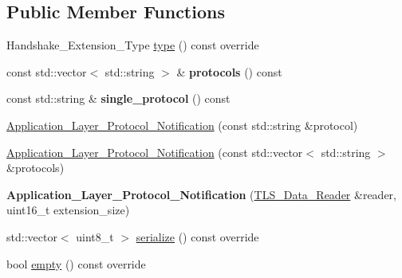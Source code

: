 \subsection*{Public Member Functions}
\begin{DoxyCompactItemize}
\item 
Handshake\+\_\+\+Extension\+\_\+\+Type \mbox{\hyperlink{class_botan_1_1_t_l_s_1_1_application___layer___protocol___notification_ab60d32531c669dd0d23fdddec69eee17}{type}} () const override
\item 
\mbox{\label{class_botan_1_1_t_l_s_1_1_application___layer___protocol___notification_ae88699feca78c6622f85a890b88dbaa2}} 
const std\+::vector$<$ std\+::string $>$ \& {\bfseries protocols} () const
\item 
\mbox{\label{class_botan_1_1_t_l_s_1_1_application___layer___protocol___notification_aabb91661b46187aac6677c6b8c67cbf1}} 
const std\+::string \& {\bfseries single\+\_\+protocol} () const
\item 
\mbox{\hyperlink{class_botan_1_1_t_l_s_1_1_application___layer___protocol___notification_a9c2deb6b705e0f4cff14fcd80b3211fe}{Application\+\_\+\+Layer\+\_\+\+Protocol\+\_\+\+Notification}} (const std\+::string \&protocol)
\item 
\mbox{\hyperlink{class_botan_1_1_t_l_s_1_1_application___layer___protocol___notification_a510b8c26bf5284ffabb9c1884ead02cf}{Application\+\_\+\+Layer\+\_\+\+Protocol\+\_\+\+Notification}} (const std\+::vector$<$ std\+::string $>$ \&protocols)
\item 
\mbox{\label{class_botan_1_1_t_l_s_1_1_application___layer___protocol___notification_a05ec806ab06cdf7aa96582111410d86f}} 
{\bfseries Application\+\_\+\+Layer\+\_\+\+Protocol\+\_\+\+Notification} (\mbox{\hyperlink{class_botan_1_1_t_l_s_1_1_t_l_s___data___reader}{T\+L\+S\+\_\+\+Data\+\_\+\+Reader}} \&reader, uint16\+\_\+t extension\+\_\+size)
\item 
std\+::vector$<$ uint8\+\_\+t $>$ \mbox{\hyperlink{class_botan_1_1_t_l_s_1_1_application___layer___protocol___notification_af665dac05218679d77fbd990e877d3d1}{serialize}} () const override
\item 
bool \mbox{\hyperlink{class_botan_1_1_t_l_s_1_1_application___layer___protocol___notification_ab6232ae6d76319a276b698c9cf69d510}{empty}} () const override
\end{DoxyCompactItemize}
